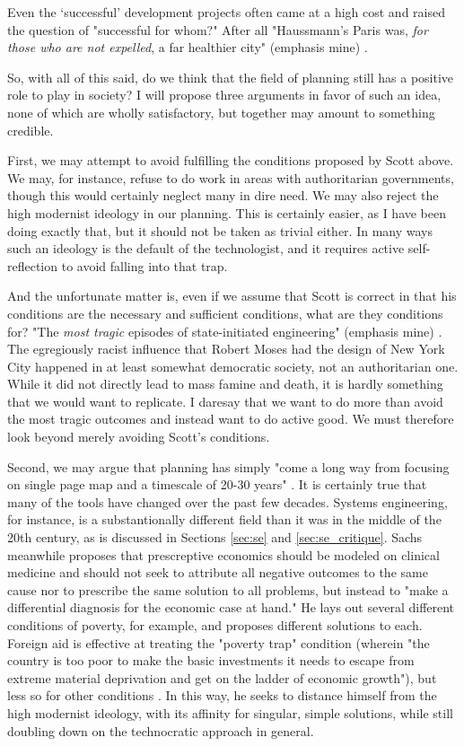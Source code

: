 Even the `successful' development projects often came at a high cost and raised the question of "successful for whom?" After all "Haussmann's Paris was, \textit{for those who are not expelled}, a far healthier city" (emphasis mine) \cite{scottSeeingStateHow2020}.

So, with all of this said, do we think that the field of planning still has a positive role to play in society? I will propose three arguments in favor of such an idea, none of which are wholly satisfactory, but together may amount to something credible.

First, we may attempt to avoid fulfilling the conditions proposed by Scott above. We may, for instance, refuse to do work in areas with authoritarian governments, though this would certainly neglect many in dire need. We may also reject the high modernist ideology in our planning. This is certainly easier, as I have been doing exactly that, but it should not be taken as trivial either. In many ways such an ideology is the default of the technologist, and it requires active self-reflection to avoid falling into that trap. 

And the unfortunate matter is, even if we assume that Scott is correct in that his conditions are the necessary and sufficient conditions, what are they conditions for? "The \textit{most tragic} episodes of state-initiated engineering" (emphasis mine) \cite{scottSeeingStateHow2020}. The egregiously racist influence that Robert Moses had the design of New York City \cite{winnerArtifactsHavePolitics1980} happened in at least somewhat democratic society, not an authoritarian one. While it did not directly lead to mass famine and death, it is hardly something that we would want to replicate. I daresay that we want to do more than avoid the most tragic outcomes and instead want to do active good. We must therefore look beyond merely avoiding Scott's conditions.

Second, we may argue that planning has simply "come a long way from focusing on single page map and a timescale of 20-30 years" \cite{robinsonSectionPlanFormulation1972}. It is certainly true that many of the tools have changed over the past few decades. Systems engineering, for instance, is a substantionally different field than it was in the middle of the 20th century, as is discussed in Sections \ref{sec:se} and \ref{sec:se_critique}. Sachs meanwhile proposes that prescreptive economics should be modeled on clinical medicine and should not seek to attribute all negative outcomes to the same cause nor to prescribe the same solution to all problems, but instead to "make a differential diagnosis for the economic case at hand." He lays out several different conditions of poverty, for example, and proposes different solutions to each. Foreign aid is effective at treating the "poverty trap" condition (wherein "the country is too poor to make the basic investments it needs to escape from extreme material deprivation and get on the ladder of economic growth"), but less so for other conditions \cite{sachsAgeSustainableDevelopment2015}. In this way, he seeks to distance himself from the high modernist ideology, with its affinity for singular, simple solutions, while still doubling down on the technocratic approach in general. 


